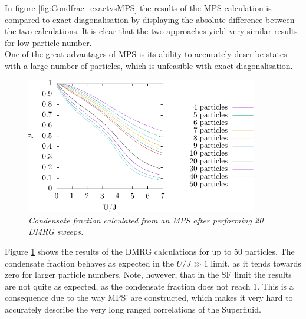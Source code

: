 In figure \ref{fig:Condfrac_exactvsMPS} the results of the MPS calculation is compared to exact diagonalisation by displaying the absolute difference between the two calculations. It is clear that the two approaches yield very similar results for low particle-number.\\
One of the great advantages of MPS is its ability to accurately describe states with a large number of particles, which is unfeasible with exact diagonalisation. 
\begin{figure}[h!]
	\centering
	\includegraphics[width=0.9\textwidth]{Figures/Condfrac_4to50.pdf}
	\caption{\textit{Condensate fraction calculated from an MPS after performing 20 DMRG sweeps.}}
	\label{fig:Condfrac_4to50}
\end{figure}
Figure \ref{fig:Condfrac_4to50} shows the results of the DMRG calculations for up to 50 particles. The condensate fraction behaves as expected in the $U/J \gg 1$ limit, as it tends towards zero for larger particle numbers. Note, however, that in the SF limit the results are not quite as expected, as the condensate fraction does not reach 1. This is a consequence due to the way MPS' are constructed, which makes it very hard to accurately describe the very long ranged correlations of the Superfluid.


